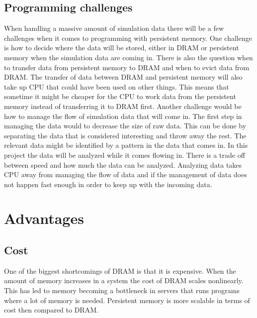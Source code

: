 \documentclass[12pt,a4paper,UKenglish]{article}
\begin{document}
\subsection{Programming challenges}
When handling a massive amount of simulation data there will be a few challenges when it comes to programming with persistent memory. One challenge is how to decide where the data will be stored, either in DRAM or persistent memory when the simulation data are coming in. There is also the question when to transfer data from persistent memory to DRAM and when to evict data from DRAM. The transfer of data between DRAM and persistent memory will also take up CPU that could have been used on other things. This means that sometime it might be cheaper for the CPU to work data from the persistent memory instead of transferring it to DRAM first. 
\newline\newline
Another challenge would be how to manage the flow of simulation data that will come in. The first step in managing the data would to decrease the size of raw data. This can be done by separating the data that is considered interesting and throw away the rest. The relevant data might be identified by a pattern in the data that comes in. 
\newline\newline
In this project the data will be analyzed while it comes flowing in. There is a trade off between speed and how much the data can be analyzed. Analyzing data takes CPU away from managing the flow of data and if the management of data does not happen fast enough in order to keep up with the incoming data.

\section{Advantages}
\subsection{Cost}
One of the biggest shortcomings of DRAM is that it is expensive. When the amount of memory increases in a system the cost of DRAM scales nonlinearly.\cite{Badam} This has led to memory becoming a bottleneck in servers that runs programs where a lot of memory is needed. Persistent memory is more scalable in terms of cost then compared to DRAM. 
\end{document}
